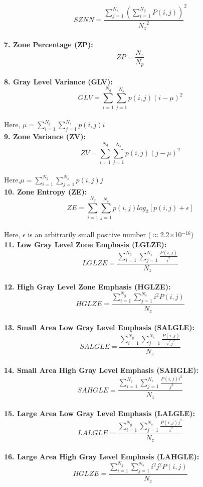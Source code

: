 \[SZNN=\frac{\sum _{j=1}^{N_{s}}\left(\sum _{i=1}^{N_{g}}P\left(i,j\right)\right)}{{N_{z}}^{2}}^{2}\]\\
\textbf{7. Zone Percentage (ZP):}\\
\[ZP=\frac{N_{z}}{N_{p}}\]\\
\textbf{8. Gray Level Variance (GLV):}\\
\[GLV=\sum _{i=1}^{N_{g}}\sum _{j=1}^{N_{s}}p\left(i,j\right)\left(i-\mu \right)^{2}\]\\
Here, $\mu =\sum _{i=1}^{N_{g}}\sum _{j=1}^{N_{s}}p\left(i,j\right)i$\\
\textbf{9. Zone Variance (ZV):}\\
\[ZV=\sum _{i=1}^{N_{g}}\sum _{j=1}^{N_{s}}p\left(i,j\right)\left(j-\mu \right)^{2}\]\\
Here,$\mu =\sum _{i=1}^{N_{g}}\sum _{j=1}^{N_{s}}p\left(i,j\right)j$\\
\textbf{10. Zone Entropy (ZE):}\\
\[ZE=\sum _{i=1}^{N_{g}}\sum _{j=1}^{N_{s}}p\left(i,j\right)log_{2}\left[p\left(i,j\right)+\epsilon \right]\]\\
Here, $\epsilon $ is an arbitrarily small positive number (${\approx}$2.2${\times}$10$^{-16}$)\\
\textbf{11. Low Gray Level Zone Emphasis (LGLZE):}\\
\[\textit{LGLZE}=\frac{\sum _{i=1}^{N_{g}}\sum _{j=1}^{N_{s}}\frac{P\left(i,j\right)}{i^{2}}}{N_{z}}\]\\
\textbf{12. High Gray Level Zone Emphasis (HGLZE):}\\
\[\textit{HGLZE}=\frac{\sum _{i=1}^{N_{g}}\sum _{j=1}^{N_{s}}i^{2}P\left(i,j\right)}{N_{z}}\] \\
\textbf{13. Small Area Low Gray Level Emphasis (SALGLE):}
\[\textit{SALGLE}=\frac{\sum _{i=1}^{N_{g}}\sum _{j=1}^{N_{s}}\frac{P\left(i,j\right)}{i^{2}j^{2}}}{N_{z}}\]\\
\textbf{14. Small Area High Gray Level Emphasis (SAHGLE):}\\
\[\textit{SAHGLE}=\frac{\sum _{i=1}^{N_{g}}\sum _{j=1}^{N_{s}}\frac{P\left(i,j\right)i^{2}}{j^{2}}}{N_{z}}\]\\
\textbf{15. Large Area Low Gray Level Emphasis (LALGLE):}\\
\[\textit{LALGLE}=\frac{\sum _{i=1}^{N_{g}}\sum _{j=1}^{N_{s}}\frac{P\left(i,j\right)j^{2}}{i^{2}}}{N_{z}}\]\\
\textbf{16. Large Area High Gray Level Emphasis (LAHGLE):}\\
\[\textit{HGLZE}=\frac{\sum _{i=1}^{N_{g}}\sum _{j=1}^{N_{s}}i^{2}j^{2}P\left(i,j\right)}{N_{z}}\]\\


